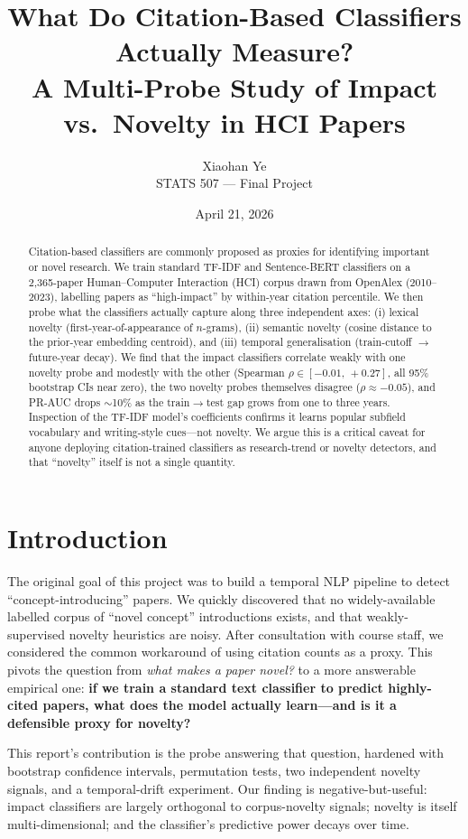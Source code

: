 \documentclass[11pt]{article}
\title{What Do Citation-Based Classifiers Actually Measure?\\
       \large A Multi-Probe Study of Impact vs.\ Novelty in HCI Papers}
\author{Xiaohan Ye \\ STATS 507 --- Final Project}
\date{April 21, 2026}
\begin{document}
\maketitle

\begin{abstract}
Citation-based classifiers are commonly proposed as proxies for identifying important or novel research. We train standard TF-IDF and Sentence-BERT classifiers on a 2{,}365-paper Human--Computer Interaction (HCI) corpus drawn from OpenAlex (2010--2023), labelling papers as ``high-impact'' by within-year citation percentile. We then probe what the classifiers actually capture along three independent axes: (i) lexical novelty (first-year-of-appearance of $n$-grams), (ii) semantic novelty (cosine distance to the prior-year embedding centroid), and (iii) temporal generalisation (train-cutoff $\to$ future-year decay). We find that the impact classifiers correlate weakly with one novelty probe and modestly with the other (Spearman $\rho \in [-0.01,\, +0.27]$, all 95\% bootstrap CIs near zero), the two novelty probes themselves disagree ($\rho \approx -0.05$), and PR-AUC drops $\sim$10\% as the train$\to$test gap grows from one to three years. Inspection of the TF-IDF model's coefficients confirms it learns popular subfield vocabulary and writing-style cues---not novelty. We argue this is a critical caveat for anyone deploying citation-trained classifiers as research-trend or novelty detectors, and that ``novelty'' itself is not a single quantity.
\end{abstract}

\section{Introduction}
The original goal of this project was to build a temporal NLP pipeline to detect ``concept-introducing'' papers. We quickly discovered that no widely-available labelled corpus of ``novel concept'' introductions exists, and that weakly-supervised novelty heuristics are noisy. After consultation with course staff, we considered the common workaround of using citation counts as a proxy. This pivots the question from \emph{what makes a paper novel?} to a more answerable empirical one: \textbf{if we train a standard text classifier to predict highly-cited papers, what does the model actually learn---and is it a defensible proxy for novelty?}

This report's contribution is the probe answering that question, hardened with bootstrap confidence intervals, permutation tests, two independent novelty signals, and a temporal-drift experiment. Our finding is negative-but-useful: impact classifiers are largely orthogonal to corpus-novelty signals; novelty is itself multi-dimensional; and the classifier's predictive power decays over time.
\end{document}
